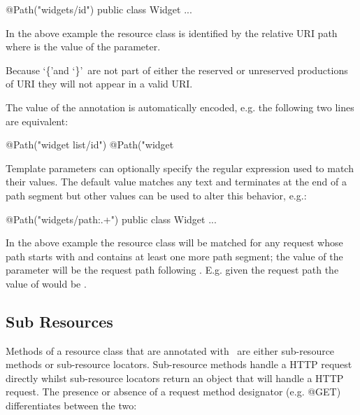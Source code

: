 \begin{listing}{1}
@Path("widgets/{id}")
public class Widget {
  ...
}\end{listing}

In the above example the  resource class is identified by the relative URI path  where  is the value of the  parameter.

\begin{nnnote}Because \lq\{\rq and \lq\}\rq\ are not part of either the reserved or unreserved productions of URI\cite{uri} they will not appear in a valid URI.\end{nnnote}

The value of the annotation is automatically encoded, e.g. the following two lines are equivalent:

\begin{listing}{1}
@Path("widget list/{id}")
@Path("widget%
\end{listing}

Template parameters can optionally specify the regular expression used to match their values. The default value matches any text and terminates at the end of a path segment but other values can be used to alter this behavior, e.g.:

\begin{listing}{1}
@Path("widgets/{path:.+}")
public class Widget {
  ...
}\end{listing}

In the above example the  resource class will be matched for any request whose path starts with  and contains at least one more path segment; the value of the  parameter will be the request path following . E.g. given the request path  the value of  would be .

\subsection{Sub Resources}
\label{sub_resources}

Methods of a resource class that are annotated with \Path\ are either sub-resource methods or sub-resource locators. Sub-resource methods handle a HTTP request directly whilst sub-resource locators return an object that will handle a HTTP request. The presence or absence of a request method designator (e.g. @GET) differentiates between the two:


